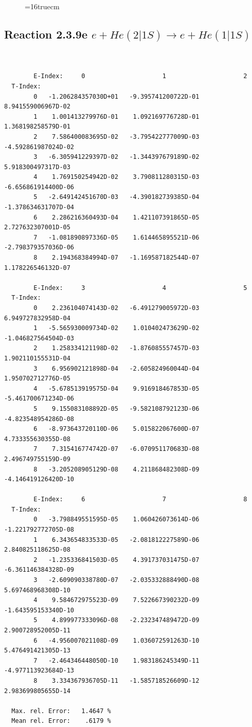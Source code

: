\documentclass[12pt,dvips]{article}
\begin{document}
\begin{figure} \label{2.3.9d}
\epsfxsize=16truecm
\end{figure}
\newpage
\subsection{
Reaction 2.3.9e  $e + He(2|1S) \rightarrow e + He(1|1S) $
}


\begin{small}\begin{verbatim}


        E-Index:     0                     1                     2
  T-Index:
        0   -1.206284357030D+01   -9.395741200722D-01    8.941559006967D-02
        1    1.001413279976D-01    1.092169776728D-01    1.368198258579D-01
        2    7.586400083695D-02   -3.795422777009D-03   -4.592861987024D-02
        3   -6.305941229397D-02   -1.344397679189D-02    5.918300497317D-03
        4    1.769150254942D-02    3.790811280315D-03   -6.656861914400D-06
        5   -2.649142451670D-03   -4.390182739385D-04   -1.378634631707D-04
        6    2.286216360493D-04    1.421107391865D-05    2.727632307001D-05
        7   -1.081890897336D-05    1.614465895521D-06   -2.798379357036D-06
        8    2.194368384994D-07   -1.169587182544D-07    1.178226546132D-07

        E-Index:     3                     4                     5
  T-Index:
        0    2.236104074143D-02   -6.491279005972D-03    6.949727832958D-04
        1   -5.565930009734D-02    1.010402473629D-02   -1.046827564504D-03
        2    1.258334121198D-02   -1.876085557457D-03    1.902110155531D-04
        3    6.956902121898D-04   -2.605824960044D-04    1.950702712776D-05
        4   -5.678513919575D-04    9.916918467853D-05   -5.461700671234D-06
        5    9.155083108892D-05   -9.582108792123D-06   -4.823548954286D-08
        6   -8.973643720110D-06    5.015822067600D-07    4.733355630355D-08
        7    7.315416774742D-07   -6.070951170683D-08    2.496749755159D-09
        8   -3.205208905129D-08    4.211868482308D-09   -4.146419126420D-10

        E-Index:     6                     7                     8
  T-Index:
        0   -3.798849551595D-05    1.060426073614D-06   -1.221792772705D-08
        1    6.343654833533D-05   -2.081812227589D-06    2.840825118625D-08
        2   -1.235336841503D-05    4.391737031475D-07   -6.361146384328D-09
        3   -2.609090338780D-07   -2.035332888490D-08    5.697468968308D-10
        4    9.584672975523D-09    7.522667390232D-09   -1.643595153340D-10
        5    4.899977333096D-08   -2.232347489472D-09    2.900728952005D-11
        6   -4.956007021108D-09    1.036072591263D-10    5.476491421305D-13
        7   -2.464346448050D-10    1.983186245349D-11   -4.977113923684D-13
        8    3.334367936705D-11   -1.585718526609D-12    2.983699805655D-14

  Max. rel. Error:   1.4647 %
  Mean rel. Error:    .6179 %


\end{verbatim}\end{small}
\end{document}
